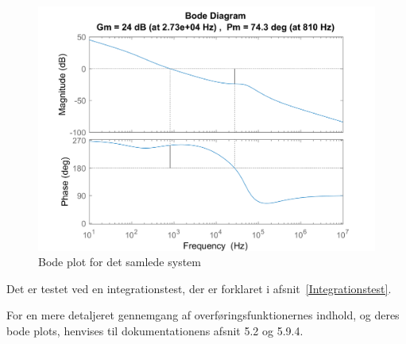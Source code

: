 \begin{figure}[H]
	\center
	\includegraphics[max width=0.7\linewidth]{../dokumentation/tex/2iteration/billeder/MATLAB_total.PNG}
	\caption{Bode plot for det samlede system}
	\label{fig:MATLAB_tot}
\end{figure}

\noindent Det er testet ved en integrationstest, der er forklaret i afsnit~\ref{Integrationstest}.

\noindent For en mere detaljeret gennemgang af overføringsfunktionernes indhold, og deres bode plots, henvises til dokumentationens afsnit 5.2 og 5.9.4.



